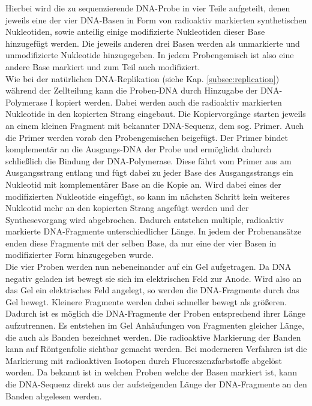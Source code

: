 Hierbei wird die zu sequenzierende DNA-Probe in vier Teile aufgeteilt, denen jeweils eine der vier DNA-Basen in Form von radioaktiv markierten synthetischen Nukleotiden, sowie anteilig einige modifizierte Nukleotiden dieser Base hinzugefügt werden. Die jeweils anderen drei Basen werden als unmarkierte und unmodifizierte Nukleotide hinzugegeben. In jedem Probengemisch ist also eine andere Base markiert und zum Teil auch modifiziert. \\

Wie bei der natürlichen DNA-Replikation (siehe Kap. \ref{subsec:replication}) während der Zellteilung kann die Proben-DNA durch Hinzugabe der DNA-Polymerase I kopiert werden. Dabei werden auch die radioaktiv markierten Nukleotide in den kopierten Strang eingebaut. Die Kopiervorgänge starten jeweils an einem kleinen Fragment mit bekannter DNA-Sequenz, dem sog. Primer. Auch die Primer werden vorab den Probengemischen beigefügt. Der Primer bindet komplementär an die Ausgangs-DNA der Probe und  ermöglicht dadurch schließlich die Bindung der DNA-Polymerase. Diese fährt vom Primer aus am Ausgangsstrang entlang und fügt dabei zu jeder Base des Ausgangsstrangs ein Nukleotid mit komplementärer Base an die Kopie an. Wird dabei eines der modifizierten Nukleotide eingefügt, so kann im nächsten Schritt kein weiteres Nukleotid mehr an den kopierten Strang angefügt werden und der Synthesevorgang wird abgebrochen. Dadurch entstehen multiple, radioaktiv markierte DNA-Fragmente unterschiedlicher Länge. In jedem der Probenansätze enden diese Fragmente mit der selben Base, da nur eine der vier Basen in modifizierter Form hinzugegeben wurde. \\

Die vier Proben werden nun nebeneinander auf ein Gel aufgetragen. Da DNA negativ geladen ist bewegt sie sich im elektrischen Feld zur Anode. Wird also an das Gel ein elektrisches Feld angelegt, so werden die DNA-Fragmente durch das Gel bewegt. Kleinere Fragmente werden dabei schneller bewegt als größeren. Dadurch ist es möglich die DNA-Fragmente der Proben entsprechend ihrer Länge aufzutrennen. Es entstehen im Gel Anhäufungen von Fragmenten gleicher Länge, die auch als Banden bezeichnet werden. Die radioaktive Markierung der Banden kann auf Röntgenfolie sichtbar gemacht werden. Bei moderneren Verfahren ist die Markierung mit radioaktiven Isotopen durch Fluoreszenzfarbstoffe abgelöst worden. Da bekannt ist in welchen Proben welche der Basen markiert ist, kann die DNA-Sequenz direkt aus der aufsteigenden Länge der DNA-Fragmente an den Banden abgelesen werden. \\


